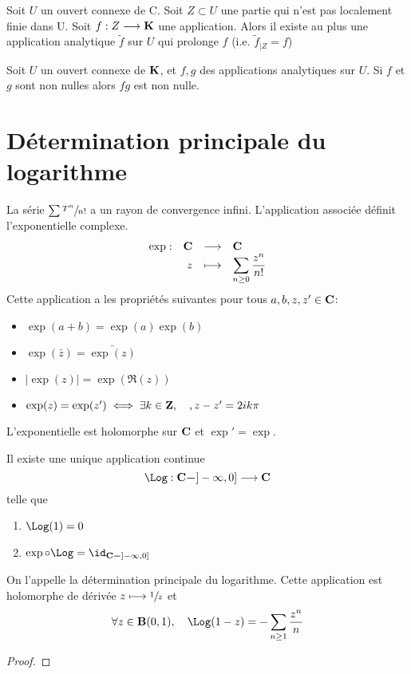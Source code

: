 \begin{cor}
    Soit $U$ un ouvert connexe de C. Soit $Z \subset U$ une partie qui n'est pas localement finie dans U. Soit $f: Z \longrightarrow \mathbf K$ une application. Alors il existe au plus une application analytique $\tilde{f}$ sur $U$ qui prolonge $f$ (i.e. $\tilde{f}_{\mid Z}=f$)
\end{cor}

\begin{cor}
Soit $U$ un ouvert connexe de $\mathbf K$, et $f,g$ des applications analytiques sur $U$. Si $f$ et $g$ sont non nulles alors $fg$ est non nulle.
\end{cor}

\section{Détermination principale du logarithme}

\begin{rem}[Rappel]
    La série $\sum \sfrac{T^n}{n!}$ a un rayon de convergence infini. L'application associée définit l'exponentielle complexe. \[
    \begin{array}{rrcl}
        \exp:& \mathbf C & \longrightarrow & \mathbf C \\
             & z & \longmapsto & \displaystyle \sum_{n\geq 0} \frac{z^n}{n!}
    \end{array}
    \] 
    Cette application a les propriétés suivantes pour tous $a, b, z, z' \in  \mathbf C$: \begin{itemize}
        \item $\exp(a+b)=\exp(a)\exp(b)$
        \item $\exp (\bar{z})=\bar{\exp (z)}$ 
        \item $|\exp(z)|=\exp(\Re(z))$
        \item $\exp(z)=\exp(z')\iff  \exists k \in  \mathbf Z, \quad , z-z'=2ik\pi$
    \end{itemize}
\end{rem}

\begin{prop}
L'exponentielle est holomorphe sur $ \mathbf C$ et $\exp'=\exp$.
\end{prop}

\begin{defprop}
Il existe une unique application continue \[
    \Log: \C \setminus ]-\infty, 0] \longrightarrow \C
\] 
telle que \begin{enumerate}
    \item $\Log(1)=0$
    \item $\exp\circ\Log=\id_{\C\setminus ]-\infty, 0]}$
\end{enumerate}
On l'appelle la détermination principale du logarithme. Cette application est holomorphe de dérivée $z\longmapsto \sfrac1z$ et \[
    \forall  z \in  \B(0, 1), \quad  \Log(1-z)=-\sum_{n\geq 1}\frac{z^n}{n}
\] 
\end{defprop}

\begin{proof}
\end{proof}
